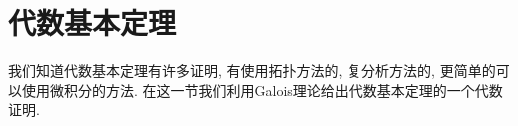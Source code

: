 \section{代数基本定理}\label{fta}

我们知道代数基本定理有许多证明, 有使用拓扑方法的, 复分析方法的, 更简单的可以使用微积分的方法.
在这一节我们利用Galois理论给出代数基本定理的一个代数证明.